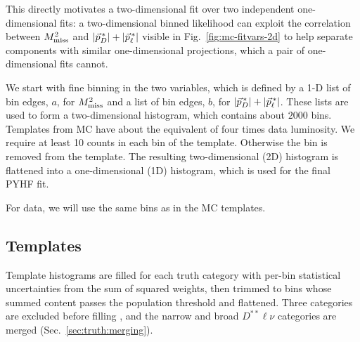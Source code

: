 This directly motivates a two-dimensional fit over two independent
one-dimensional fits: a two-dimensional binned likelihood can exploit the
correlation between $M_{\mathrm{miss}}^{2}$ and $|\vec{p}^{\,*}_{D}| + |\vec{p}^{\,*}_{\ell}|$ visible in
Fig.~\ref{fig:mc-fitvars-2d} to help separate components with similar
one-dimensional projections, which a pair of one-dimensional fits cannot.


 We start with fine binning in the two variables, which is defined by a
 1-D list of bin edges, $a$, for $M_{\mathrm{miss}}^{2}$ and a list of bin edges, $b$, for $|\vec{p}^{\,*}_{D}| + |\vec{p}^{\,*}_{\ell}|$. These lists are used to form a two-dimensional histogram, which contains about $2000$ bins. Templates from MC
have about the equivalent of four times data luminosity. We require at least 10 counts in each bin of the template. Otherwise the bin is removed from the template. The resulting two-dimensional (2D) histogram is flattened into a
one-dimensional (1D) histogram, which is used for the final PYHF fit.

For data, we will use the same bins as in the MC templates.


\subsection{Templates}
\label{sec:fit:templates}

Template histograms are filled for each truth category with per-bin statistical
uncertainties from the sum of squared weights, then trimmed to bins whose
summed content passes the population threshold and flattened.
Three categories are excluded before filling
,
and the narrow and broad $D^{**}\ell\nu$
categories are merged (Sec.~\ref{sec:truth:merging}).

